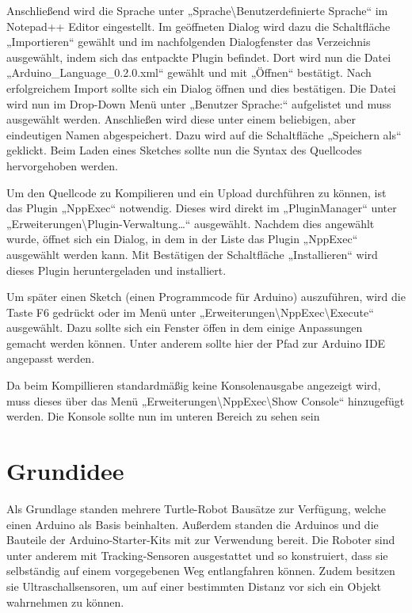 Anschließend wird die Sprache unter „Sprache\textbackslash{}Benutzerdefinierte Sprache“ im Notepad++ Editor eingestellt. Im geöffneten Dialog wird dazu die Schaltfläche „Importieren“ gewählt und im nachfolgenden Dialogfenster das Verzeichnis ausgewählt, indem sich das entpackte Plugin befindet. Dort wird nun die Datei „Arduino\_Language\_0.2.0.xml“ gewählt und mit „Öffnen“ bestätigt. Nach erfolgreichem Import sollte sich ein Dialog öffnen und dies bestätigen. Die Datei wird nun im Drop-Down Menü unter „Benutzer Sprache:“ aufgelistet und muss ausgewählt werden. Anschließen wird diese unter einem beliebigen, aber eindeutigen Namen abgespeichert. Dazu wird auf die Schaltfläche „Speichern als“ geklickt. Beim Laden eines Sketches sollte nun die Syntax des Quellcodes hervorgehoben werden.

Um den Quellcode zu Kompilieren und ein Upload durchführen zu können, ist das Plugin „NppExec“ notwendig. Dieses wird direkt im „PluginManager“ unter „Erweiterungen\textbackslash{}Plugin-Verwaltung…“ ausgewählt. Nachdem dies angewählt wurde, öffnet sich ein Dialog, in dem in der Liste das Plugin „NppExec“ ausgewählt werden kann. Mit Bestätigen der Schaltfläche „Installieren“ wird dieses Plugin heruntergeladen und installiert. 

Um später einen Sketch (einen Programmcode für Arduino) auszuführen, wird die Taste F6 gedrückt oder im Menü unter „Erweiterungen\textbackslash{}NppExec\textbackslash{}Execute“ ausgewählt. Dazu sollte sich ein Fenster öffen in dem einige Anpassungen gemacht werden können. Unter anderem sollte hier der Pfad zur Arduino IDE angepasst werden. 

Da beim Kompillieren standardmäßig keine Konsolenausgabe angezeigt wird, muss dieses über das Menü  „Erweiterungen\textbackslash{}NppExec\textbackslash{}Show Console“ hinzugefügt werden. Die Konsole sollte nun im unteren Bereich zu sehen sein

\section{Grundidee}

Als Grundlage standen mehrere Turtle-Robot Bausätze zur Verfügung, welche einen Arduino als Basis beinhalten. Außerdem
standen die Arduinos und die Bauteile der Arduino-Starter-Kits mit zur Verwendung bereit. Die Roboter
sind unter anderem mit Tracking-Sensoren ausgestattet und so konstruiert, dass sie selbständig
auf einem vorgegebenen Weg entlangfahren können. Zudem besitzen sie Ultraschallsensoren,
um auf einer bestimmten Distanz vor sich ein Objekt wahrnehmen zu können.

